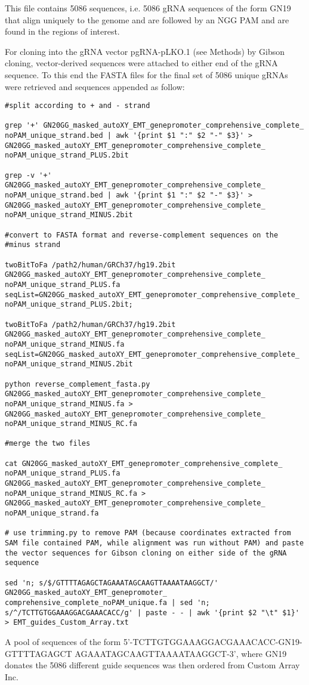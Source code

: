 This file contains 5086 sequences, i.e. 5086 gRNA sequences of the form GN19 that align uniquely to the genome and are followed by an NGG PAM and are found in the regions of interest.

For cloning into the gRNA vector pgRNA-pLKO.1 (see Methods) by Gibson cloning, vector-derived sequences were attached to either end of the gRNA sequence. To this end the FASTA files for the final set of 5086 unique gRNAs were retrieved and sequences appended as follow:

\begin{lstlisting}
#split according to + and - strand 

grep '+' GN20GG_masked_autoXY_EMT_genepromoter_comprehensive_complete_ noPAM_unique_strand.bed | awk '{print $1 ":" $2 "-" $3}' > GN20GG_masked_autoXY_EMT_genepromoter_comprehensive_complete_ noPAM_unique_strand_PLUS.2bit

grep -v '+' GN20GG_masked_autoXY_EMT_genepromoter_comprehensive_complete_ noPAM_unique_strand.bed | awk '{print $1 ":" $2 "-" $3}' > GN20GG_masked_autoXY_EMT_genepromoter_comprehensive_complete_ noPAM_unique_strand_MINUS.2bit

#convert to FASTA format and reverse-complement sequences on the 
#minus strand

twoBitToFa /path2/human/GRCh37/hg19.2bit GN20GG_masked_autoXY_EMT_genepromoter_comprehensive_complete_ noPAM_unique_strand_PLUS.fa seqList=GN20GG_masked_autoXY_EMT_genepromoter_comprehensive_complete_ noPAM_unique_strand_PLUS.2bit;

twoBitToFa /path2/human/GRCh37/hg19.2bit GN20GG_masked_autoXY_EMT_genepromoter_comprehensive_complete_ noPAM_unique_strand_MINUS.fa seqList=GN20GG_masked_autoXY_EMT_genepromoter_comprehensive_complete_ noPAM_unique_strand_MINUS.2bit

python reverse_complement_fasta.py GN20GG_masked_autoXY_EMT_genepromoter_comprehensive_complete_ noPAM_unique_strand_MINUS.fa > GN20GG_masked_autoXY_EMT_genepromoter_comprehensive_complete_ noPAM_unique_strand_MINUS_RC.fa

#merge the two files

cat GN20GG_masked_autoXY_EMT_genepromoter_comprehensive_complete_
noPAM_unique_strand_PLUS.fa GN20GG_masked_autoXY_EMT_genepromoter_comprehensive_complete_
noPAM_unique_strand_MINUS_RC.fa > GN20GG_masked_autoXY_EMT_genepromoter_comprehensive_complete_
noPAM_unique_strand.fa

# use trimming.py to remove PAM (because coordinates extracted from SAM file contained PAM, while alignment was run without PAM) and paste the vector sequences for Gibson cloning on either side of the gRNA sequence

sed 'n; s/$/GTTTTAGAGCTAGAAATAGCAAGTTAAAATAAGGCT/' GN20GG_masked_autoXY_EMT_genepromoter_ comprehensive_complete_noPAM_unique.fa | sed 'n; s/^/TCTTGTGGAAAGGACGAAACACC/g' | paste - - | awk '{print $2 "\t" $1}' > EMT_guides_Custom_Array.txt
\end{lstlisting}

A pool of sequences of the form 5'-TCTTGTGGAAAGGACGAAACACC-GN19-GTTTTAGAGCT AGAAATAGCAAGTTAAAATAAGGCT-3', where GN19 donates the 5086 different guide sequences was then ordered from Custom Array Inc. 

